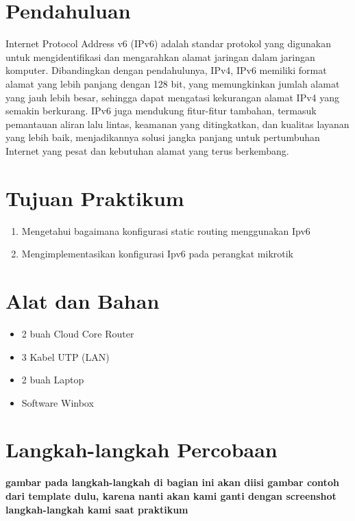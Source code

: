 \section{Pendahuluan}
\indent Internet Protocol Address v6 (IPv6) adalah standar protokol yang digunakan untuk mengidentifikasi
dan mengarahkan alamat jaringan dalam jaringan komputer. Dibandingkan dengan pendahulunya,
IPv4, IPv6 memiliki format alamat yang lebih panjang dengan 128 bit, yang memungkinkan jumlah
alamat yang jauh lebih besar, sehingga dapat mengatasi kekurangan alamat IPv4 yang semakin berkurang. IPv6 juga mendukung fitur-fitur tambahan, termasuk pemantauan aliran lalu lintas, keamanan
yang ditingkatkan, dan kualitas layanan yang lebih baik, menjadikannya solusi jangka panjang untuk
pertumbuhan Internet yang pesat dan kebutuhan alamat yang terus berkembang.



\section{Tujuan Praktikum}
\begin{enumerate}
	\item Mengetahui bagaimana konfigurasi static routing menggunakan Ipv6
	\item Mengimplementasikan konfigurasi Ipv6 pada perangkat mikrotik
\end{enumerate}


\section{Alat dan Bahan}
\begin{itemize}[label=$\bullet$, itemsep=-1pt, leftmargin=*]
	\item 2 buah Cloud Core Router
	\item 3 Kabel UTP (LAN)
	\item 2 buah Laptop
	\item Software Winbox
\end{itemize}

\section{Langkah-langkah Percobaan}
\textbf{gambar pada langkah-langkah di bagian ini akan diisi gambar contoh dari template dulu,
		karena nanti akan kami ganti dengan screenshot langkah-langkah kami saat praktikum}

